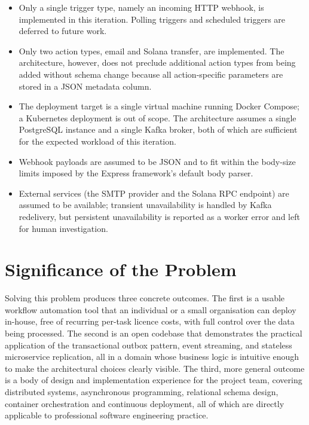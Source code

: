 \begin{itemize}
\item Only a single trigger type, namely an incoming HTTP webhook, is implemented in this iteration. Polling triggers and scheduled triggers are deferred to future work.
\item Only two action types, email and Solana transfer, are implemented. The architecture, however, does not preclude additional action types from being added without schema change because all action-specific parameters are stored in a JSON metadata column.
\item The deployment target is a single virtual machine running Docker Compose; a Kubernetes deployment is out of scope. The architecture assumes a single PostgreSQL instance and a single Kafka broker, both of which are sufficient for the expected workload of this iteration.
\item Webhook payloads are assumed to be JSON and to fit within the body-size limits imposed by the Express framework's default body parser.
\item External services (the SMTP provider and the Solana RPC endpoint) are assumed to be available; transient unavailability is handled by Kafka redelivery, but persistent unavailability is reported as a worker error and left for human investigation.
\end{itemize}

\section{Significance of the Problem}

Solving this problem produces three concrete outcomes. The first is a usable workflow automation tool that an individual or a small organisation can deploy in-house, free of recurring per-task licence costs, with full control over the data being processed. The second is an open codebase that demonstrates the practical application of the transactional outbox pattern, event streaming, and stateless microservice replication, all in a domain whose business logic is intuitive enough to make the architectural choices clearly visible. The third, more general outcome is a body of design and implementation experience for the project team, covering distributed systems, asynchronous programming, relational schema design, container orchestration and continuous deployment, all of which are directly applicable to professional software engineering practice.
